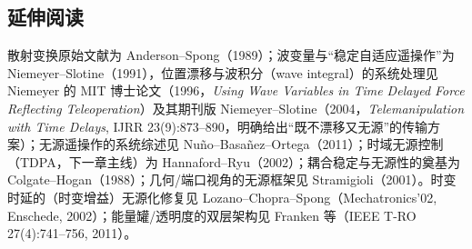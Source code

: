 \subsection*{延伸阅读}
散射变换原始文献为 Anderson--Spong（1989）\cite{anderson1989bilateral}；波变量与“稳定自适应遥操作”为 Niemeyer--Slotine（1991）\cite{niemeyer1991stable}，位置漂移与波积分（wave integral）的系统处理见 Niemeyer 的 MIT 博士论文（1996，\emph{Using Wave Variables in Time Delayed Force Reflecting Teleoperation}）及其期刊版 Niemeyer--Slotine（2004，\emph{Telemanipulation with Time Delays}, IJRR 23(9):873--890，明确给出“既不漂移又无源”的传输方案）；无源遥操作的系统综述见 Nu\~no--Basa\~nez--Ortega（2011）\cite{nuno2011passivity}；时域无源控制（TDPA，下一章主线）为 Hannaford--Ryu（2002）\cite{hannaford2002time}；耦合稳定与无源性的奠基为 Colgate--Hogan（1988）\cite{colgate1988robust}；几何/端口视角的无源框架见 Stramigioli（2001）\cite{stramigioli2001modeling}。时变时延的（时变增益）无源化修复见 Lozano--Chopra--Spong（Mechatronics'02, Enschede, 2002）；能量罐/透明度的双层架构见 Franken 等（IEEE T-RO 27(4):741--756, 2011）。
